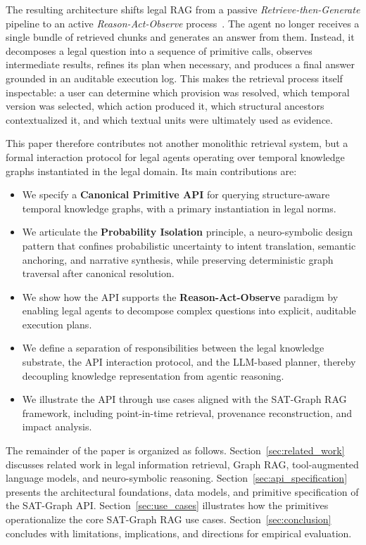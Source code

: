 \documentclass[11pt]{article}
\begin{document}
The resulting architecture shifts legal RAG from a passive \textit{Retrieve-then-Generate} pipeline to an active \textit{Reason-Act-Observe} process~\cite{yao2023react}. The agent no longer receives a single bundle of retrieved chunks and generates an answer from them. Instead, it decomposes a legal question into a sequence of primitive calls, observes intermediate results, refines its plan when necessary, and produces a final answer grounded in an auditable execution log. This makes the retrieval process itself inspectable: a user can determine which provision was resolved, which temporal version was selected, which action produced it, which structural ancestors contextualized it, and which textual units were ultimately used as evidence.

This paper therefore contributes not another monolithic retrieval system, but a formal interaction protocol for legal agents operating over temporal knowledge graphs instantiated in the legal domain. Its main contributions are:

\begin{itemize}
    \item We specify a \textbf{Canonical Primitive API} for querying structure-aware temporal knowledge graphs, with a primary instantiation in legal norms.
    \item We articulate the \textbf{Probability Isolation} principle, a neuro-symbolic design pattern that confines probabilistic uncertainty to intent translation, semantic anchoring, and narrative synthesis, while preserving deterministic graph traversal after canonical resolution.
    \item We show how the API supports the \textbf{Reason-Act-Observe} paradigm by enabling legal agents to decompose complex questions into explicit, auditable execution plans.
    \item We define a separation of responsibilities between the legal knowledge substrate, the API interaction protocol, and the LLM-based planner, thereby decoupling knowledge representation from agentic reasoning.
    \item We illustrate the API through use cases aligned with the SAT-Graph RAG framework, including point-in-time retrieval, provenance reconstruction, and impact analysis.
\end{itemize}

The remainder of the paper is organized as follows. Section~\ref{sec:related_work} discusses related work in legal information retrieval, Graph RAG, tool-augmented language models, and neuro-symbolic reasoning. Section~\ref{sec:api_specification} presents the architectural foundations, data models, and primitive specification of the SAT-Graph API. Section~\ref{sec:use_cases} illustrates how the primitives operationalize the core SAT-Graph RAG use cases. Section~\ref{sec:conclusion} concludes with limitations, implications, and directions for empirical evaluation.
\end{document}
